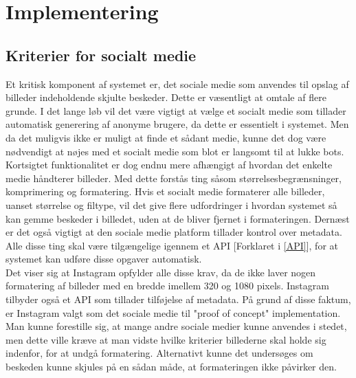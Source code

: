 \section{Implementering}

\subsection{Kriterier for socialt medie}
\label{Kriterier_Medie}
Et kritisk komponent af systemet er, det sociale medie som anvendes til opslag af billeder indeholdende skjulte beskeder. Dette er væsentligt at omtale af flere grunde. I det lange løb vil det være vigtigt at vælge et socialt medie som tillader automatisk generering af anonyme brugere, da dette er essentielt i systemet. Men da det muligvis ikke er muligt at finde et sådant medie, kunne det dog være nødvendigt at nøjes med et socialt medie som blot er langsomt til at lukke bots. Kortsigtet funktionalitet er dog endnu mere afhængigt af hvordan det enkelte medie håndterer billeder. Med dette forstås ting såsom størrelsesbegrænsninger, komprimering og formatering. Hvis et socialt medie formaterer alle billeder, uanset størrelse og filtype, vil det give flere udfordringer i hvordan systemet så kan gemme beskeder i billedet, uden at de bliver fjernet i formateringen. Dernæst er det også vigtigt at den sociale medie platform tillader kontrol over metadata. Alle disse ting skal være tilgængelige igennem et API [Forklaret i \ref{API}], for at systemet kan udføre disse opgaver automatisk.\\
Det viser sig at Instagram opfylder alle disse krav, da de ikke laver nogen formatering af billeder med en bredde imellem 320 og 1080 pixels.\cite{Instagram_Photo_Resolution}\cite{Instagram_Image_Compression} Instagram tilbyder også et API som tillader tilføjelse af metadata. På grund af disse faktum, er Instagram valgt som det sociale medie til "proof of concept" implementation. Man kunne forestille sig, at mange andre sociale medier kunne anvendes i stedet, men dette ville kræve at man vidste hvilke kriterier billederne skal holde sig indenfor, for at undgå formatering. Alternativt kunne det undersøges om beskeden kunne skjules på en sådan måde, at formateringen ikke påvirker den. 

